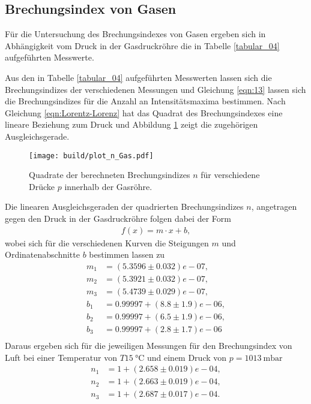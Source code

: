 \subsection{Brechungsindex von Gasen}
\noindent Für die Untersuchung des Brechungsindexes von Gasen ergeben sich in
Abhängigkeit vom Druck in der Gasdruckröhre die in Tabelle \ref{tabular_04}
aufgeführten Messwerte. \\
\FloatBarrier

\FloatBarrier
\noindent Aus den in Tabelle \ref{tabular_04} aufgeführten Messwerten lassen sich
die Brechungsindizes der verschiedenen Messungen und Gleichung \ref{eqn:13}
lassen sich die Brechungsindizes für die Anzahl an Intensitätsmaxima bestimmen.
Nach Gleichung \ref{eqn:Lorentz-Lorenz} hat das Quadrat des Brechungsindexes eine lineare Beziehung zum Druck
und Abbildung \ref{fig:03} zeigt die zugehörigen Ausgleichsgerade. \\
\FloatBarrier
\begin{figure}
  \centering
  \texttt{[image: build/plot\_n\_Gas.pdf]}
  \caption{Quadrate der berechneten Brechungsindizes $n$ für verschiedene Drücke
  $p$ innerhalb der Gasröhre.}
  \label{fig:03}
\end{figure}
\FloatBarrier
\noindent Die linearen Ausgleichsgeraden der quadrierten Brechungsindizes $n$,
angetragen gegen den Druck in der Gasdruckröhre folgen dabei der Form
\begin{align}
  f(x) = m \cdot x + b,
\end{align}
wobei sich für die verschiedenen Kurven die Steigungen $m$ und Ordinatenabschnitte
$b$ bestimmen lassen zu
\begin{align*}
  m_1 &= (5.3596 \pm 0.032)e-07, \\
  m_2 &= (5.3921 \pm 0.032)e-07, \\
  m_3 &= (5.4739 \pm 0.029)e-07, \\
  b_1 &= 0.99997 + (8.8 \pm 1.9)e-06, \\
  b_2 &= 0.99997 + (6.5 \pm 1.9)e-06, \\
  b_3 &= 0.99997 + (2.8 \pm 1.7)e-06 \\
\end{align*}
%
%
%
%
\noindent Daraus ergeben sich für die jeweiligen Messungen für den Brechungsindex
von Luft bei einer Temperatur von $T \SI{15}{\celsius}$ und einem Druck von
$p = \num{1013}\:\text{mbar}$
\begin{align}
  n_1 &= 1 + (2.658 \pm 0.019)e-04, \\
  n_2 &= 1 + (2.663 \pm 0.019)e-04, \\
  n_3 &= 1 + (2.687 \pm 0.017)e-04. \\
\end{align}
